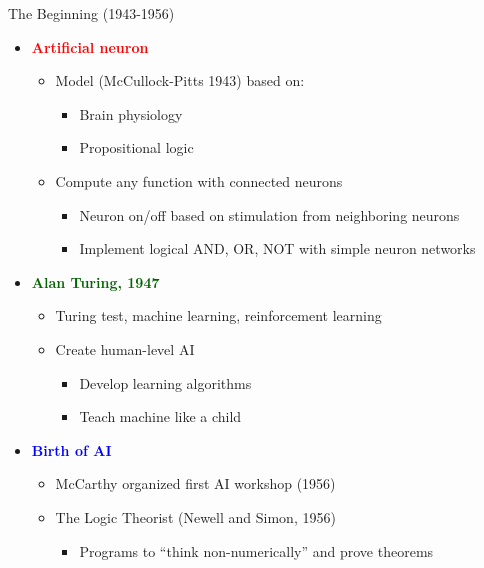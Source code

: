 \documentclass[
  10pt,
  ignorenonframetext,
]{beamer}
\providecommand{\tightlist}{%
  \setlength{\itemsep}{0pt}\setlength{\parskip}{0pt}}
\begin{document}
\begin{frame}{The Beginning (1943-1956)}
\label{the-beginning-1943-1956}
\begin{itemize}
\tightlist
\item
  \textbf{\textcolor{red}{Artificial neuron}}

  \begin{itemize}
  \tightlist
  \item
    Model (McCullock-Pitts 1943) based on:

    \begin{itemize}
    \tightlist
    \item
      Brain physiology
    \item
      Propositional logic
    \end{itemize}
  \item
    Compute any function with connected neurons

    \begin{itemize}
    \tightlist
    \item
      Neuron on/off based on stimulation from neighboring neurons
    \item
      Implement logical AND, OR, NOT with simple neuron networks
    \end{itemize}
  \end{itemize}
\item
  \textbf{\textcolor{darkgreen}{Alan Turing, 1947}}

  \begin{itemize}
  \tightlist
  \item
    Turing test, machine learning, reinforcement learning
  \item
    Create human-level AI

    \begin{itemize}
    \tightlist
    \item
      Develop learning algorithms
    \item
      Teach machine like a child
    \end{itemize}
  \end{itemize}
\item
  \textbf{\textcolor{blue}{Birth of AI}}

  \begin{itemize}
  \tightlist
  \item
    McCarthy organized first AI workshop (1956)
  \item
    The Logic Theorist (Newell and Simon, 1956)

    \begin{itemize}
    \tightlist
    \item
      Programs to ``think non-numerically'' and prove theorems
    \end{itemize}
  \end{itemize}
\end{itemize}
\end{frame}
\end{document}
